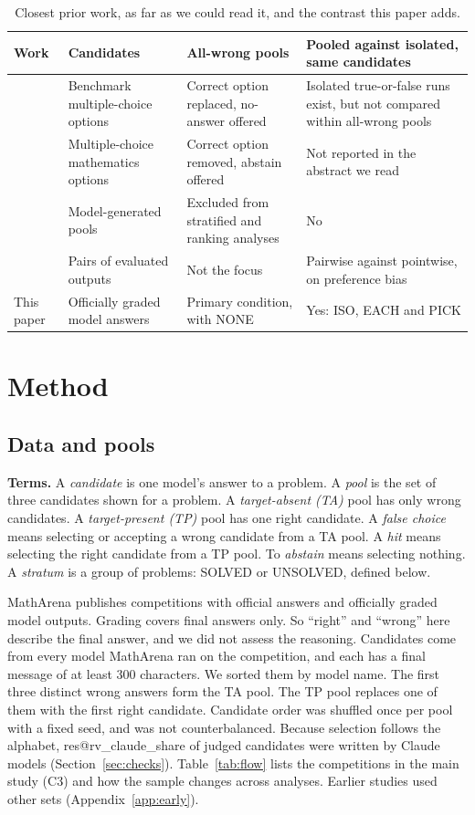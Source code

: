 \documentclass[10pt,twocolumn]{article}
\makeatletter
\newcommand{\res}[1]{\csname res@#1\endcsname}
\makeatother
\begin{document}
\begin{table}[t]
\centering\small
\begin{tabular}{p{2.7cm}p{4.0cm}p{4.2cm}p{4.8cm}}
\toprule
Work & Candidates & All-wrong pools & Pooled against isolated, same candidates \\
\midrule
\citet{wang2025llms} & Benchmark multiple-choice options & Correct option replaced, no-answer offered & Isolated true-or-false runs exist, but not compared within all-wrong pools \\
\citet{kim2026penalty} & Multiple-choice mathematics options & Correct option removed, abstain offered & Not reported in the abstract we read \\
\citet{ji2026candidate} & Model-generated pools & Excluded from stratified and ranking analyses & No \\
\citet{jeong2025comparative} & Pairs of evaluated outputs & Not the focus & Pairwise against pointwise, on preference bias \\
This paper & Officially graded model answers & Primary condition, with NONE & Yes: ISO, EACH and PICK \\
\bottomrule
\end{tabular}
\caption{Closest prior work, as far as we could read it, and the contrast this paper adds.}
\label{tab:related}
\end{table}

\section{Method}
\subsection{Data and pools}
\textbf{Terms.} A \emph{candidate} is one model's answer to a problem. A \emph{pool} is the set of three candidates shown for a problem. A \emph{target-absent (TA)} pool has only wrong candidates. A \emph{target-present (TP)} pool has one right candidate. A \emph{false choice} means selecting or accepting a wrong candidate from a TA pool. A \emph{hit} means selecting the right candidate from a TP pool. To \emph{abstain} means selecting nothing. A \emph{stratum} is a group of problems: SOLVED or UNSOLVED, defined below.

MathArena \citep{balunovic2025matharena} publishes competitions with official answers and officially graded model outputs. Grading covers final answers only. So ``right'' and ``wrong'' here describe the final answer, and we did not assess the reasoning. Candidates come from every model MathArena ran on the competition, and each has a final message of at least 300 characters. We sorted them by model name. The first three distinct wrong answers form the TA pool. The TP pool replaces one of them with the first right candidate. Candidate order was shuffled once per pool with a fixed seed, and was not counterbalanced. Because selection follows the alphabet, \res{rv_claude_share} of judged candidates were written by Claude models (Section~\ref{sec:checks}). Table~\ref{tab:flow} lists the competitions in the main study (C3) and how the sample changes across analyses. Earlier studies used other sets (Appendix~\ref{app:early}).
\end{document}
